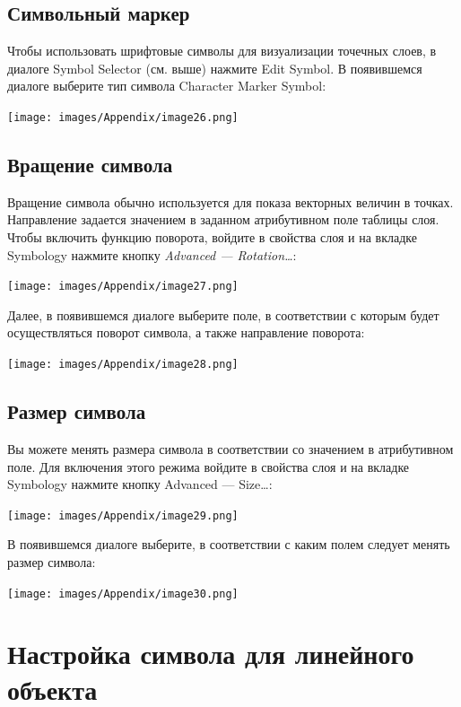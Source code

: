 \documentclass[12pt,]{book}
\begin{document}
\hypertarget{manual-vector-symbol}{%
\subsection{Символьный маркер}\label{manual-vector-symbol}}

Чтобы использовать шрифтовые символы для визуализации точечных слоев, в диалоге Symbol Selector (см. выше) нажмите Edit Symbol. В появившемся диалоге выберите тип символа Character Marker Symbol:

\texttt{[image: images/Appendix/image26.png]}

\hypertarget{manual-vector-rotation}{%
\subsection{Вращение символа}\label{manual-vector-rotation}}

Вращение символа обычно используется для показа векторных величин в точках. Направление задается значением в заданном атрибутивном поле таблицы слоя. Чтобы включить функцию поворота, войдите в свойства слоя и на вкладке Symbology нажмите кнопку \emph{Advanced --- Rotation\ldots{}}:

\texttt{[image: images/Appendix/image27.png]}

Далее, в появившемся диалоге выберите поле, в соответствии с которым будет осуществляться поворот символа, а также направление поворота:

\texttt{[image: images/Appendix/image28.png]}

\hypertarget{manual-vector-size}{%
\subsection{Размер символа}\label{manual-vector-size}}

Вы можете менять размера символа в соответствии со значением в атрибутивном поле. Для включения этого режима войдите в свойства слоя и на вкладке Symbology нажмите кнопку Advanced --- Size\ldots:

\texttt{[image: images/Appendix/image29.png]}

В появившемся диалоге выберите, в соответствии с каким полем следует менять размер символа:

\texttt{[image: images/Appendix/image30.png]}

\hypertarget{manual-vector-line}{%
\section{Настройка символа для линейного объекта}\label{manual-vector-line}}
\end{document}
